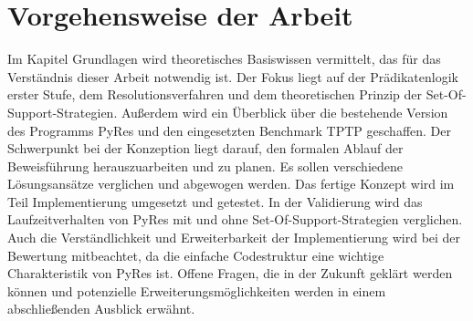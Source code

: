 \section{Vorgehensweise der Arbeit}

Im Kapitel Grundlagen wird theoretisches Basiswissen vermittelt, das für das Verständnis dieser Arbeit notwendig ist. Der Fokus liegt auf der Prädikatenlogik erster Stufe, dem Resolutionsverfahren und dem theoretischen Prinzip der Set-Of-Support-Strategien. Außerdem wird ein Überblick über die bestehende Version des Programms PyRes und den eingesetzten Benchmark TPTP geschaffen.
Der Schwerpunkt bei der Konzeption liegt darauf, den formalen Ablauf der Beweisführung herauszuarbeiten und zu planen. Es sollen verschiedene Lösungsansätze verglichen und abgewogen werden. Das fertige Konzept wird im Teil Implementierung umgesetzt und getestet.
In der Validierung wird das Laufzeitverhalten von PyRes mit und ohne Set-Of-Support-Strategien verglichen. Auch die Verständlichkeit und Erweiterbarkeit der Implementierung wird bei der Bewertung mitbeachtet, da die einfache Codestruktur eine wichtige Charakteristik von PyRes ist. Offene Fragen, die in der Zukunft geklärt werden können und potenzielle Erweiterungsmöglichkeiten werden in einem abschließenden Ausblick erwähnt.